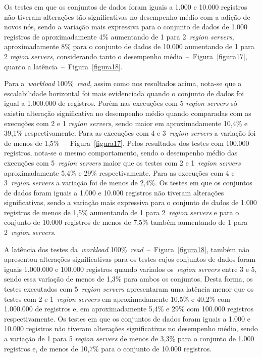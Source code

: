 \documentclass[12pt]{article}
\begin{document}
Os testes em que os conjuntos de dados foram iguais a 1.000 e 10.000 registros não tiveram alterações tão significativas no desempenho médio com a adição de novos nós, sendo a variação mais expressiva para o conjunto de dados de 1.000 registros de aproximadamente 4\% aumentando de 1 para 2~\emph{region servers}, aproximadamente 8\% para o conjunto de dados de 10.000 aumentando de 1 para 2 \emph{region servers}, considerando tanto o desempenho médio~--~Figura~\ref{figura17}, quanto a latência~--~Figura~\ref{figura18}.


Para a~\emph{workload} 100\%~\emph{read}, assim como nos resultados acima, nota-se que a escalabilidade horizontal foi mais evidenciada quando o conjunto de dados foi igual a 1.000.000 de registros. Porém nas execuções com 5 \emph{region servers} só existiu alteração significativa no desempenho médio quando comparadas com as execuções com 2 e 1 \emph{region servers}, sendo maior em aproximadamente 10,4\% e 39,1\% respectivamente. Para as execuções com 4 e 3~\emph{region servers} a variação foi de menos de 1,5\%~--~Figura~\ref{figura17}. Pelos resultados dos testes com 100.000 registros, nota-se o mesmo comportamento, sendo o desempenho médio das execuções com 5~\emph{region servers} maior que os testes com 2 e 1~\emph{region servers} aproximadamente 5,4\% e 29\% respectivamente. Para as execuções com 4 e 3~\emph{region servers} a variação foi de menos de 2,4\%. Os testes em que os conjuntos de dados foram iguais a 1.000 e 10.000 registros não tiveram alterações significativas, sendo a variação mais expressiva para o conjunto de dados de 1.000 registros de menos de 1,5\% aumentando de 1 para 2~\emph{region servers} e para o conjunto de 10.000 registros de menos de 7,5\% também aumentando de 1 para 2~\emph{region servers}.

A latência dos testes da~\emph{workload} 100\%~\emph{read}~--~Figura~\ref{figura18}, também não apresentou alterações significativas para os testes cujos conjuntos de dados foram iguais 1.000.000 e 100.000 registros quando variados os~\emph{region servers} entre 3 e 5, sendo essa variação de menos de 1,3\% para ambos os conjuntos. Desta forma, os testes executados com 5~\emph{region servers} apresentaram uma latência menor que os testes com 2 e 1~\emph{region servers} em aproximadamente 10,5\% e 40,2\% com 1.000.000 de registros e, em aproximadamente 5,4\% e 29\% com 100.000 registros respectivamente. Os testes em que os conjuntos de dados foram iguais a 1.000 e 10.000 registros não tiveram alterações significativas no desempenho médio, sendo a variação de 1 para 5 \emph{region servers} de menos de 3,3\% para o conjunto de 1.000 registros e, de menos de 10,7\% para o conjunto de 10.000 registros.
\end{document}
